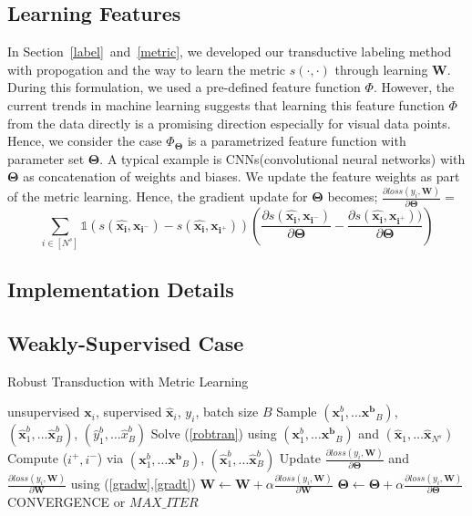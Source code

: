 \subsection{Learning Features}
In Section~\ref{label}~and~\ref{metric}, we developed our transductive labeling method with propogation and the way to learn the metric $s(\cdot,\cdot)$ through learning $\mathbf{W}$. During this formulation, we used a pre-defined feature function $\Phi$. However, the current trends in machine learning suggests that learning this feature function $\Phi$ from the data directly is a promising direction especially for visual data points. Hence, we consider the case $\Phi_{\mathbf{\Theta}}$ is a parametrized feature function with parameter set $\mathbf{\Theta}$. A typical example is CNNs(convolutional neural networks) with $\mathbf{\Theta}$ as concatenation of weights and biases. We update the feature weights as part of the metric learning. Hence, the gradient update for $\mathbf{\Theta}$ becomes; $\frac{\partial loss (y_i, \mathbf{W})}{\partial \mathbf{\Theta}} =$
\begin{equation}
 \sum_{i \in [N^s]} \mathds{1}(s(\mathbf{\hat{x_i}},\mathbf{x_{i^-}}) - s(\mathbf{\hat{x_i}},\mathbf{x_{i^+}})) \left(\frac{\partial s(\mathbf{\hat{x_i}},\mathbf{x_{i^-}}) }{\partial \mathbf{\Theta}} - \frac{\partial s(\mathbf{\hat{x_i}},\mathbf{x_{i^+}})) }{\partial \mathbf{\Theta}} \right)
 \label{gradt}
\end{equation}

\subsection{Implementation Details}
\subsection{Weakly-Supervised Case}

\begin{algorithm}[tb]
   \caption{Robust Transduction with Metric Learning}
   \label{alg:example}
\begin{algorithmic}
    unsupervised $\mathbf{x}_i$, supervised $\mathbf{\hat{x}}_i$, $y_i$, batch size $B$
   \REPEAT
   \STATE  Sample $(\mathbf{x}^b_1,\ldots \mathbf{x^b}_B)$, $(\mathbf{\hat{x}}^b_1,\ldots \mathbf{\hat{x}}^b_B)$, $(\hat{y}^b_1,\ldots \hat{x}^b_B)$
   \STATE Solve (\ref{robtran}) using $(\mathbf{x}^b_1,\ldots \mathbf{x^b}_B)$ and  $(\mathbf{\hat{x}}_1,\ldots \mathbf{\hat{x}}_{N^s})$
   \STATE Compute ($i^+, i^-$) via $(\mathbf{x}^b_1,\ldots \mathbf{x^b}_B)$, $(\mathbf{\hat{x}}^b_1,\ldots \mathbf{\hat{x}}^b_B)$ 
   \STATE Update $\frac{\partial loss (y_i, \mathbf{W})}{\partial \mathbf{\Theta}}$ and  $\frac{\partial loss (y_i, \mathbf{W})}{\partial \mathbf{W}} $ using (\ref{gradw},\ref{gradt})
   \ENDIF
   \ENDFOR
   \STATE $\mathbf{W} \leftarrow \mathbf{W} + \alpha \frac{\partial loss (y_i, \mathbf{W})}{\partial \mathbf{W}}$ 
   \STATE $\mathbf{\Theta} \leftarrow \mathbf{\Theta} + \alpha \frac{\partial loss (y_i, \mathbf{W})}{\partial \mathbf{\Theta}}$
   \UNTIL CONVERGENCE or $MAX\_ITER$
\end{algorithmic}
\end{algorithm}